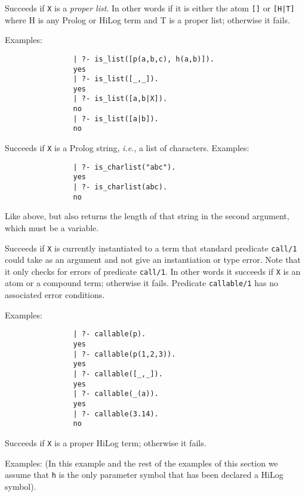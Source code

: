 \begin{description}
    Succeeds if {\tt X} is a {\em proper list}. In other words if it is 
    either the atom {\tt []} or {\tt [H|T]} where H is any Prolog or HiLog
    term and T is a proper list; otherwise it fails.

    Examples:
    {\footnotesize
     \begin{verbatim}
                | ?- is_list([p(a,b,c), h(a,b)]).
                yes
                | ?- is_list([_,_]).
                yes
                | ?- is_list([a,b|X]).
                no
                | ?- is_list([a|b]).
                no
     \end{verbatim}}

    Succeeds if {\tt X} is a Prolog string, {\it i.e.}, a list of
    characters.
    Examples:
    {\footnotesize
     \begin{verbatim}
                | ?- is_charlist("abc").
                yes
                | ?- is_charlist(abc).
                no
     \end{verbatim}}
    Like above, but also returns the length of that string in the second
    argument, which must be a variable.

    Succeeds if {\tt X} is currently instantiated to a term that standard
    predicate {\tt call/1} could take as an argument and not give an 
    instantiation or type error.  Note that it only checks for errors of
    predicate {\tt call/1}.  In other words it succeeds if {\tt X}
    is an atom or a compound term; otherwise it fails.  Predicate
    {\tt callable/1} has no associated error conditions.

    Examples:
    {\footnotesize
     \begin{verbatim}
                | ?- callable(p).
                yes
                | ?- callable(p(1,2,3)).
                yes
                | ?- callable([_,_]).
                yes
                | ?- callable(_(a)).
                yes
                | ?- callable(3.14).
                no
     \end{verbatim}}

    Succeeds if {\tt X} is a proper HiLog term; otherwise it fails.

    Examples:
    (In this example and the rest of the examples of this section we assume
     that {\tt h} is the only parameter symbol that has been declared a HiLog
     symbol).


\end{description}

